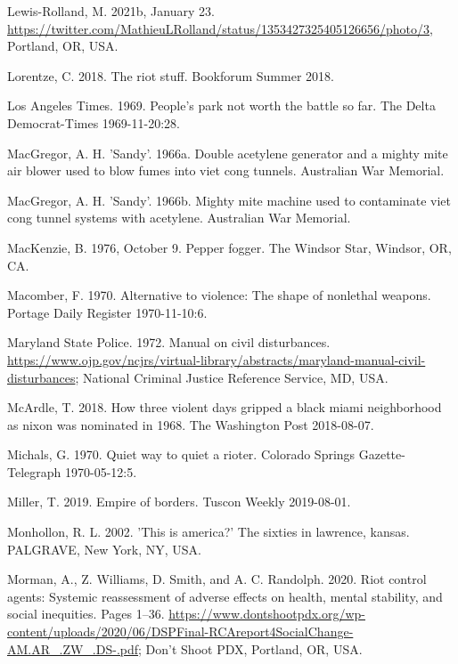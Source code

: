 \documentclass[
  11pt,
]{krantz}
\newlength{\cslhangindent}
\newenvironment{CSLReferences}[2] %
 {%
  \setlength{\parindent}{0pt}
  \ifodd #1 \everypar{\setlength{\hangindent}{\cslhangindent}}\ignorespaces\fi
  \ifnum #2 > 0
  \setlength{\parskip}{#2\baselineskip}
  \fi
 }%
 {}
\begin{document}
\begin{CSLReferences}{1}{0}
\leavevmode{}%
Lewis-Rolland, M. 2021b, January 23. \url{https://twitter.com/MathieuLRolland/status/1353427325405126656/photo/3}, Portland, OR, USA.

\leavevmode{}%
Lorentze, C. 2018. The riot stuff. Bookforum Summer 2018.

\leavevmode{}%
Los Angeles Times. 1969. People's park not worth the battle so far. The Delta Democrat-Times 1969-11-20:28.

\leavevmode{}%
MacGregor, A. H. 'Sandy'. 1966a. Double acetylene generator and a mighty mite air blower used to blow fumes into viet cong tunnels. Australian War Memorial.

\leavevmode{}%
MacGregor, A. H. 'Sandy'. 1966b. Mighty mite machine used to contaminate viet cong tunnel systems with acetylene. Australian War Memorial.

\leavevmode{}%
MacKenzie, B. 1976, October 9. Pepper fogger. The Windsor Star, Windsor, OR, CA.

\leavevmode{}%
Macomber, F. 1970. Alternative to violence: The shape of nonlethal weapons. Portage Daily Register 1970-11-10:6.

\leavevmode{}%
Maryland State Police. 1972. Manual on civil disturbances. \url{https://www.ojp.gov/ncjrs/virtual-library/abstracts/maryland-manual-civil-disturbances}; National Criminal Justice Reference Service, MD, USA.

\leavevmode{}%
McArdle, T. 2018. How three violent days gripped a black miami neighborhood as nixon was nominated in 1968. The Washington Post 2018-08-07.

\leavevmode{}%
Michals, G. 1970. Quiet way to quiet a rioter. Colorado Springs Gazette-Telegraph 1970-05-12:5.

\leavevmode{}%
Miller, T. 2019. Empire of borders. Tuscon Weekly 2019-08-01.

\leavevmode{}%
Monhollon, R. L. 2002. 'This is america?' The sixties in lawrence, kansas. PALGRAVE, New York, NY, USA.

\leavevmode{}%
Morman, A., Z. Williams, D. Smith, and A. C. Randolph. 2020. Riot control agents: Systemic reassessment of adverse effects on health, mental stability, and social inequities. Pages 1--36. \url{https://www.dontshootpdx.org/wp-content/uploads/2020/06/DSPFinal-RCAreport4SocialChange-AM.AR_.ZW_.DS-.pdf}; Don't Shoot PDX, Portland, OR, USA.


\end{CSLReferences}
\end{document}

